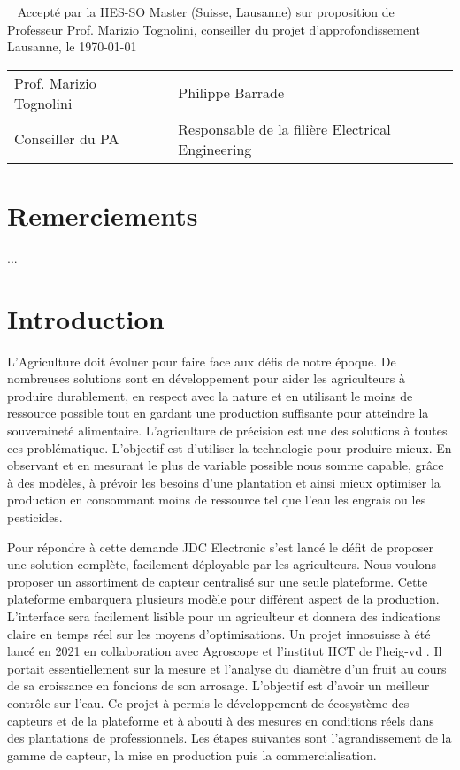 \documentclass[a4paper, french, 10pt]{article} %
\newcommand{\prof}{Prof. Marizio Tognolini}
\begin{document}


\newpage
\thispagestyle{empty}
\
\newpage
\thispagestyle{empty}
Accepté par la HES-SO Master (Suisse, Lausanne) sur proposition de\\[10pt]
Professeur \prof, conseiller du projet d'approfondissement\\[30pt]
Lausanne, le \today\\[40pt]

\begin{tabular}{lll}
\prof & \hspace{4cm} & Philippe Barrade\\
Conseiller du PA & \hspace{4cm} & Responsable de la filière Electrical Engineering\\
\end{tabular}

\newpage
\thispagestyle{empty}
\section*{Remerciements}
...

\newpage
\thispagestyle{empty}
\tableofcontents

\newpage

\section{Introduction}
L'Agriculture doit évoluer pour faire face aux défis de notre époque. De nombreuses solutions sont en développement pour aider les agriculteurs à produire durablement, en respect avec la nature et en utilisant le moins de ressource possible tout en gardant une production suffisante pour atteindre la souveraineté alimentaire. L'agriculture de précision est une des solutions à toutes ces problématique. L'objectif est d'utiliser la technologie pour produire mieux. En observant et en mesurant le plus de variable possible nous somme capable, grâce à des modèles, à prévoir les besoins d'une plantation et ainsi mieux optimiser la production en consommant moins de ressource tel que l'eau les engrais ou les pesticides. 

Pour répondre à cette demande JDC Electronic s'est lancé le défit de proposer une solution complète, facilement déployable par les agriculteurs. Nous voulons proposer un assortiment de capteur centralisé sur une seule plateforme. Cette plateforme embarquera plusieurs modèle pour différent aspect de la production. L'interface sera facilement lisible pour un agriculteur et donnera des indications claire en temps réel sur les moyens d’optimisations. Un projet innosuisse à été lancé en 2021 en collaboration avec Agroscope et l'institut IICT de l'heig-vd . Il portait essentiellement sur la mesure et l'analyse du diamètre d'un fruit au cours de sa croissance en foncions de son arrosage. L'objectif est d'avoir un meilleur contrôle sur l'eau. Ce projet à permis le développement de écosystème des capteurs et de la plateforme et à abouti à des mesures en conditions réels dans des plantations de professionnels. Les étapes suivantes sont l’agrandissement de la gamme de capteur, la mise en production puis la commercialisation.
\end{document}
